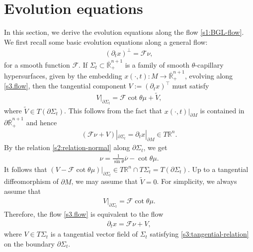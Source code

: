 \documentclass[11pt,reqno]{amsart}
\theoremstyle{definition}
\theoremstyle{remark}
\numberwithin{equation}{section}
\renewcommand{\(}{\left(}
\renewcommand{\)}{\right)}
\renewcommand{\widetilde}{\tilde}
\renewcommand{\-}{\overline}
\renewcommand{\t}{\theta}
\begin{document}
\section{Evolution equations}\label{sec:3}
In this section, we derive the evolution equations along the flow \eqref{s1:BGL-flow}. We first recall some basic evolution equations along a general flow:
\begin{align}\label{s3.flow}
(\partial_tx)^\bot=\mathcal{F}\nu,
\end{align}
for a smooth function $\mathcal{F}$. If $\Sigma_t\subset \-{\mathbb R}_+^{n+1}$ is a family of smooth $\t$-capillary hypersurfaces, given by the embedding $x(\cdot,t): M\to \-{\mathbb R}_+^{n+1}$, evolving along \eqref{s3.flow}, then the tangential component $V:=(\partial_t x)^\top$ must satisfy
\begin{align*}
V|_{\partial \Sigma_t}=\mathcal{F}\cot \t \mu+\widetilde{V},
\end{align*}
where $\widetilde{V}\in T (\partial \Sigma_t)$. This follows from the fact that $x(\cdot,t)|_{\partial M}$ is contained in $\partial \overline{\mathbb R}^{n+1}_+$ and hence
\begin{align*}
(\mathcal{F}\nu+V)|_{\partial \Sigma_t}=\partial_t x|_{\partial M} \in T\mathbb R^n.
\end{align*}
By the relation \eqref{s2:relation-normal} along $\partial \Sigma_t$, we get
\begin{align*}
\nu=\frac{1}{\sin\t}\-\nu-\cot\t \mu.
\end{align*}
It follows that $(V-\mathcal{F}\cot\t\mu)|_{\partial\Sigma_t} \in T\mathbb R^n \cap T\Sigma_t=T(\partial \Sigma_t)$. Up to a tangential diffeomorphism of $\partial M$, we may assume that $\widetilde{V}=0$. For simplicity, we always assume that
\begin{align}\label{s3:tangential-relation}
V|_{\partial \Sigma_t}=\mathcal{F}\cot\t \mu.
\end{align}
Therefore, the flow \eqref{s3.flow} is equivalent to the flow
\begin{align}\label{s2:general-flow}
\partial_tx=\mathcal{F}\nu+V,
\end{align}
where $V\in T\Sigma_t$ is a tangential vector field of $\Sigma_t$ satisfying \eqref{s3:tangential-relation} on the boundary $\partial\Sigma_t$.
\end{document}
